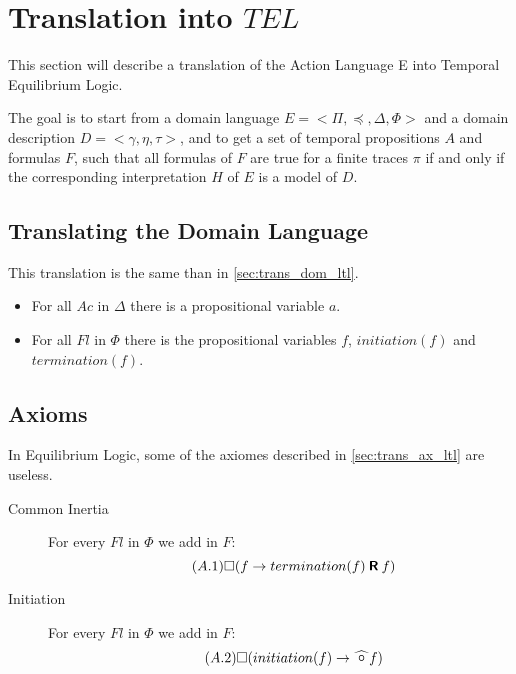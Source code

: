 \section{Translation into $TEL$}\label{sec:translation_e}

This section will describe a translation of the Action Language E into Temporal Equilibrium Logic.

The goal is to start from a domain language $E=<\Pi,\preceq,\Delta,\Phi>$ and a domain description $D=<\gamma,\eta,\tau>$, and to get a set of temporal propositions $A$ and formulas $F$, such that all formulas of $F$ are true for a finite traces $\pi$ if and only if the corresponding interpretation $H$ of $E$ is a model of $D$.

\subsection{Translating the Domain Language}

This translation is the same than in \ref{sec:trans_dom_ltl}.

\begin{itemize}
  \item For all $Ac$ in $\Delta$ there is a propositional variable $a$.
  \item For all $Fl$ in $\Phi$ there is the propositional variables $f$, $initiation(f)$ and $termination(f)$.
\end{itemize}

\subsection{Axioms}

In Equilibrium Logic, some of the axiomes described in \ref{sec:trans_ax_ltl} are useless.

\begin{description}
  \item[Common Inertia]
  For every $Fl$ in $\Phi$ we add in $F$:
  \begin{equation}\tag{$A.1$}
    \square(f\rightarrow termination(f) \mathbin{\bm{\mathsf{R}}} f)
  \end{equation}
  \item[Initiation]
  For every $Fl$ in $\Phi$ we add in $F$:
  \begin{equation}\tag{$A.2$}
    \alwaysF(initiation(f)\rightarrow\wnext f)
  \end{equation}
\end{description}

